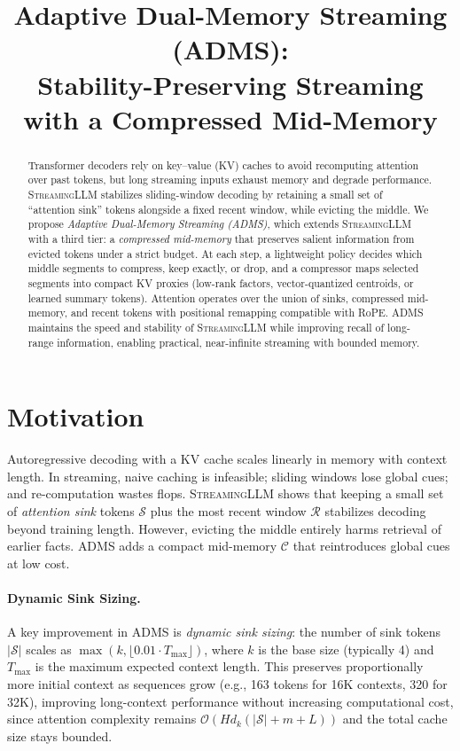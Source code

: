 \documentclass[11pt]{article}
\title{Adaptive Dual-Memory Streaming (ADMS):\\
Stability-Preserving Streaming with a Compressed Mid-Memory}
\author{}
\date{}
\newcommand{\model}{\textsc{ADMS}} %
\newcommand{\streaming}{\textsc{StreamingLLM}}
\newcommand{\kv}{KV}
\newcommand{\sink}{\mathcal{S}}
\newcommand{\recent}{\mathcal{R}}
\newcommand{\compressed}{\mathcal{C}}
\begin{document}
\maketitle

\begin{abstract}
Transformer decoders rely on key--value (\kv) caches to avoid recomputing attention over past tokens, but long streaming inputs exhaust memory and degrade performance. \streaming{} stabilizes sliding-window decoding by retaining a small set of ``attention sink'' tokens alongside a fixed recent window, while evicting the middle. We propose \emph{Adaptive Dual-Memory Streaming (ADMS)}, which extends \streaming{} with a third tier: a \emph{compressed mid-memory} that preserves salient information from evicted tokens under a strict budget. At each step, a lightweight policy decides which middle segments to compress, keep exactly, or drop, and a compressor maps selected segments into compact \kv{} proxies (low-rank factors, vector-quantized centroids, or learned summary tokens). Attention operates over the union of sinks, compressed mid-memory, and recent tokens with positional remapping compatible with RoPE. \model{} maintains the speed and stability of \streaming{} while improving recall of long-range information, enabling practical, near-infinite streaming with bounded memory.
\end{abstract}

\section{Motivation}
Autoregressive decoding with a \kv{} cache scales linearly in memory with context length. In streaming, naive caching is infeasible; sliding windows lose global cues; and re-computation wastes flops. \streaming{} shows that keeping a small set of \emph{attention sink} tokens $\sink$ plus the most recent window $\recent$ stabilizes decoding beyond training length. However, evicting the middle entirely harms retrieval of earlier facts. \model{} adds a compact mid-memory $\compressed$ that reintroduces global cues at low cost.

\paragraph{Dynamic Sink Sizing.}
A key improvement in \model{} is \emph{dynamic sink sizing}: the number of sink tokens $|\sink|$ scales as $\max(k, \lfloor 0.01 \cdot T_{\max}\rfloor)$, where $k$ is the base size (typically 4) and $T_{\max}$ is the maximum expected context length. This preserves proportionally more initial context as sequences grow (e.g., 163 tokens for 16K contexts, 320 for 32K), improving long-context performance without increasing computational cost, since attention complexity remains $\mathcal{O}(H d_k (|\sink| + m + L))$ and the total cache size stays bounded.
\end{document}

